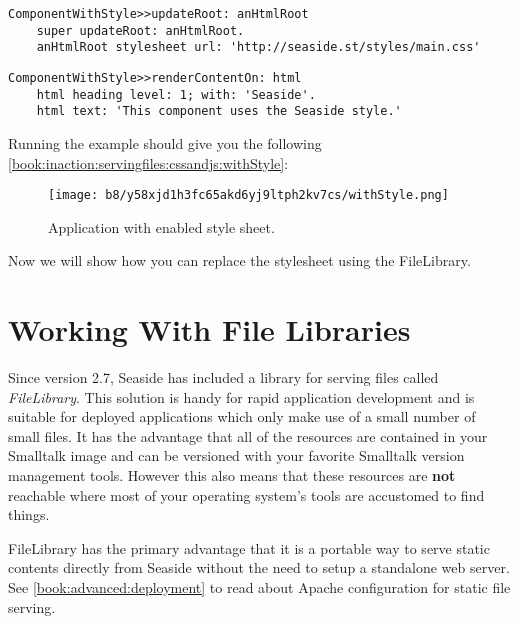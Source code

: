 \documentclass[a4paper,10pt,twoside]{book}
\begin{document}
\begin{lstlisting}
ComponentWithStyle>>updateRoot: anHtmlRoot
    super updateRoot: anHtmlRoot.
    anHtmlRoot stylesheet url: 'http://seaside.st/styles/main.css'
\end{lstlisting}

\begin{lstlisting}
ComponentWithStyle>>renderContentOn: html
    html heading level: 1; with: 'Seaside'.
    html text: 'This component uses the Seaside style.'
\end{lstlisting}

Running the example should give you the following \autoref{book:inaction:servingfiles:cssandjs:withStyle}:

\begin{figure}[h!tbp]
	\begin{center}
		\texttt{[image: b8/y58xjd1h3fc65akd6yj9ltph2kv7cs/withStyle.png]}
		\caption{Application with enabled style sheet.\label{book:inaction:servingfiles:cssandjs:withStyle}}
	\end{center}
\end{figure}

  
Now we will show how you can replace the stylesheet using the FileLibrary. 

\section{Working With File Libraries}
\label{book:inaction:servingfiles:filelibraries}

Since version 2.7, Seaside has included a library for serving files called \textit{FileLibrary}. This solution is handy for rapid application development and is suitable for deployed applications which only make use of a small number of small files. It has the advantage that all of the resources are contained in your Smalltalk image and can be versioned with your favorite Smalltalk version management tools. However this also means that these resources are \textbf{not} reachable where most of your operating system's tools are accustomed to find things.

FileLibrary has the primary advantage that it is a portable way to serve static contents directly from Seaside without the need to setup a standalone web server. See \autoref{book:advanced:deployment} to read about Apache configuration for static file serving.
\end{document}

